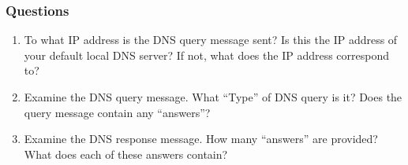     \subsubsection*{Questions}
        \begin{enumerate}[label=\bfseries Problem \arabic*:,leftmargin=*,labelindent=1em]
        \addtocounter{enumi}{14}
            \item To what IP address is the DNS query message sent? 
            Is this the IP address of your default local DNS server? 
            If not, what does the IP address correspond to?\\[0.2mm]
            \soln
            
            \item Examine the DNS query message. 
            What “Type” of DNS query is it? Does the query message contain any “answers”?\\[0.2mm]
            \soln
            
            \item Examine the DNS response message. How many “answers” are provided?
            What does each of these answers contain?\\[0.2mm]
            \soln
        \end{enumerate}